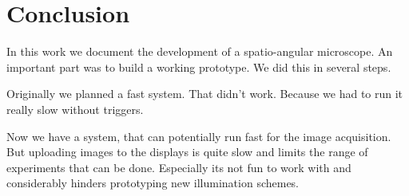 \chapter{Conclusion}
In this work we document the development of a spatio-angular
microscope. An important part was to build a working prototype. We did
this in several steps.


Originally we planned a fast system. That didn't work.
Because we had to run it really slow without triggers.

Now we have a system, that can potentially run fast for the image
acquisition.  But uploading images to the displays is quite slow and
limits the range of experiments that can be done. Especially its not
fun to work with and considerably hinders prototyping new illumination
schemes.

